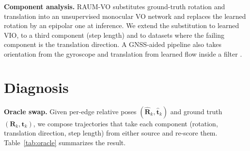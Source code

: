\documentclass[letterpaper,journal]{IEEEtran}
\begin{document}
\textbf{Component analysis.} RAUM-VO \cite{Cimarelli2022} substitutes ground-truth rotation and translation into an unsupervised monocular VO network and replaces the learned rotation by an epipolar one at inference. We extend the substitution to learned VIO, to a third component (step length) and to datasets where the failing component is the translation direction. A GNSS-aided pipeline also takes orientation from the gyroscope and translation from learned flow inside a filter \cite{Kang2025}.

\section{Diagnosis}
\label{sec:diag}

\textbf{Oracle swap.} Given per-edge relative poses $(\hat{\mathbf{R}}_k,\hat{\mathbf{t}}_k)$ and ground truth $(\mathbf{R}_k,\mathbf{t}_k)$, we compose trajectories that take each component (rotation, translation direction, step length) from either source and re-score them. Table~\ref{tab:oracle} summarizes the result.

\begin{table}[t]
\caption{Oracle swaps. KITTI: our reproduction of the base network (released code, with-08 split, checkpoint selected on the test drives as in the released code), $t_\mathrm{rel}$\,\% / $r_\mathrm{rel}$\,$^\circ$/100\,m, mean of 05/07/10. EuRoC: learned models, SE(3) ATE (m), MH\_05/V2\_02/V1\_01/V1\_02.}
\label{tab:oracle}
\centering\small
\setlength{\tabcolsep}{4pt}
\end{table}
\end{document}
